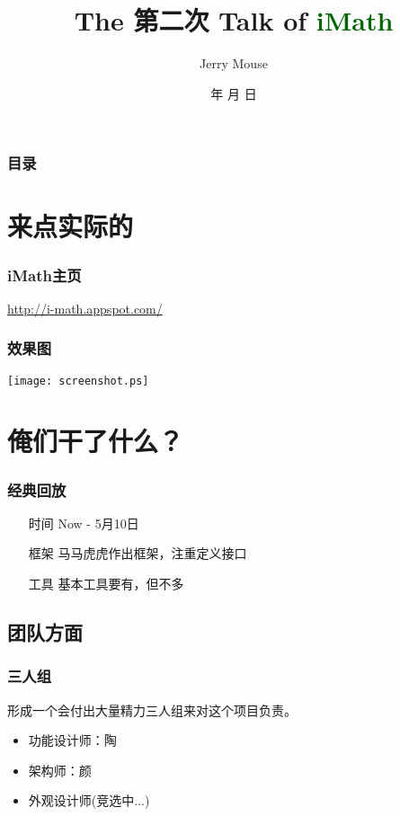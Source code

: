 \documentclass[dvipdfm,serif,mathserif]{beamer}
\renewcommand{\today}{\number\year 年 \number\month 月 \number\day 日}
\begin{document}
\title{The 第二次 Talk of \textcolor{darkgreen}{iMath}}
\date{\today}
\author{Jerry Mouse}

\begin{frame}
  \titlepage
\end{frame}
\begin{frame}\frametitle{目录}
\tableofcontents
\end{frame}



\section{来点实际的}


\begin{frame}
\frametitle{iMath主页}
 \href{http://i-math.appspot.com/}{http://i-math.appspot.com/}
\end{frame}

\begin{frame}
  \frametitle{效果图}
  \texttt{[image: screenshot.ps]}
\end{frame}


\section{俺们干了什么？}

\begin{frame}
  \frametitle{经典回放}
\begin{itemize}
 \item[时间] Now -  5月10日
 \item[框架] 马马虎虎作出框架，注重定义接口
 \item[工具] 基本工具要有，但不多
\end{itemize}
\end{frame}

\subsection{团队方面}

\begin{frame}
  \frametitle{三人组}
形成一个会付出大量精力三人组来对这个项目负责。
\begin{itemize}
 \item 功能设计师：陶
\item 架构师：颜
\item 外观设计师(竞选中...)
\end{itemize}
\end{frame}
\end{document}
